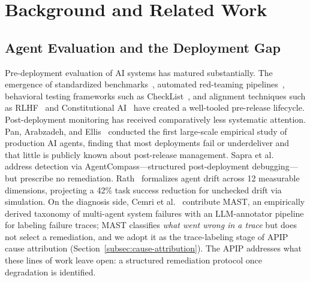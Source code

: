 \section{Background and Related Work}
\label{sec:background}

\subsection{Agent Evaluation and the Deployment Gap}
\label{subsec:deployment-gap}

Pre-deployment evaluation of AI systems has matured substantially. The
emergence of standardized benchmarks~\cite{liang2022holistic}, automated
red-teaming pipelines~\cite{ganguli2022redteaming,perez2022redteaming},
behavioral testing frameworks such as CheckList~\cite{ribeiro2020checklist},
and alignment techniques such as RLHF~\cite{ouyang2022instructions} and
Constitutional AI~\cite{anthropic2023constitutional} have created a well-tooled
pre-release lifecycle. Post-deployment monitoring has received comparatively
less systematic attention. Pan, Arabzadeh, and Ellis~\cite{pan2025measuring}
conducted the first large-scale empirical study of production AI agents,
finding that most deployments fail or underdeliver and that little is publicly
known about post-release management. Sapra et al.~\cite{sapra2025agentcompass}
address detection via AgentCompass---structured post-deployment
debugging---but prescribe no remediation. Rath~\cite{rath2026drift} formalizes
agent drift across 12 measurable dimensions, projecting a 42\% task success
reduction for unchecked drift via simulation. On the diagnosis side, Cemri et
al.~\cite{cemri2025mast} contribute MAST, an empirically derived taxonomy of
multi-agent system failures with an LLM-annotator pipeline for labeling failure
traces; MAST classifies \emph{what went wrong in a trace} but does not select a
remediation, and we adopt it as the trace-labeling stage of APIP cause
attribution (Section~\ref{subsec:cause-attribution}). The APIP addresses what
these lines of work leave open: a structured remediation protocol once
degradation is identified.

